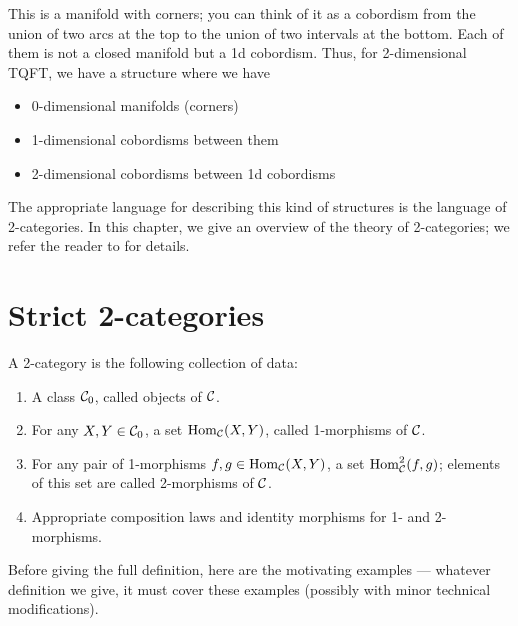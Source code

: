 This is a manifold with corners; you can think of it as a cobordism from the
union of two arcs at the top to the union of two intervals at the bottom. Each
of them is not a closed manifold but a 1d cobordism. Thus, for 2-dimensional
TQFT,  we have a structure where we have
\begin{itemize}
  \item 0-dimensional manifolds (corners)
  \item 1-dimensional cobordisms between them
  \item 2-dimensional cobordisms between 1d cobordisms
\end{itemize}

The appropriate language for describing this kind of structures is the
language of 2-categories. In this chapter, we give an overview of the theory
of 2-categories; we refer the reader to  for details.

\section{Strict 2-categories}\label{s:2cat-strict}
\begin{predefinition}\label{d:2-cat-prelim}
  A 2-category is the following collection of data:
  \begin{enumerate}
    \item A class $\mathcal{C}_0$, called objects of $\mathcal{C}$.
    \item For any $X,Y\in \mathcal{C}_0$, a set $\operatorname{Hom}_{\mathcal{C}}(X,Y)$,
    called 1-morphisms of $\mathcal{C}$.
    \item For any pair of 1-morphisms $f,g\in \operatorname{Hom}_{\mathcal{C}}(X,Y)$, a set
      $\operatorname{Hom}^2_{\mathcal{C}}(f,g)$; elements of this set are called
      2-morphisms of $\mathcal{C}$.
    \item Appropriate composition laws and identity morphisms for 1-
      and 2-morphisms.
  \end{enumerate}
\end{predefinition}
Before giving the full definition, here are the motivating examples ---
whatever definition we give, it must cover these examples (possibly with minor
technical modifications).

